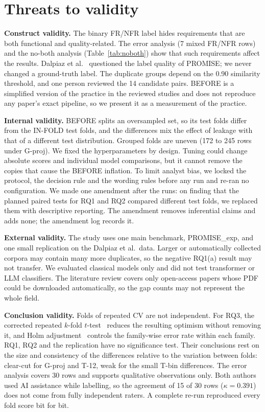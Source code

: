 \section{Threats to validity}
\label{sec:threats}

\textbf{Construct validity.} The binary FR/NFR label hides requirements that are both functional and quality-related. The error analysis (7 mixed FR/NFR rows) and the no-both analysis (Table~\ref{tab:noboth}) show that such requirements affect the results. Dalpiaz et al.~\cite{dalpiaz2019} questioned the label quality of PROMISE; we never changed a ground-truth label. The duplicate groups depend on the 0.90 similarity threshold, and one person reviewed the 14 candidate pairs. BEFORE is a simplified version of the practice in the reviewed studies and does not reproduce any paper's exact pipeline, so we present it as a measurement of the practice.

\textbf{Internal validity.} BEFORE splits an oversampled set, so its test folds differ from the IN-FOLD test folds, and the differences mix the effect of leakage with that of a different test distribution. Grouped folds are uneven (172 to 245 rows under G-proj). We fixed the hyperparameters by design. Tuning could change absolute scores and individual model comparisons, but it cannot remove the copies that cause the BEFORE inflation. To limit analyst bias, we locked the protocol, the decision rule and the wording rules before any run and re-ran no configuration. We made one amendment after the runs: on finding that the planned paired tests for RQ1 and RQ2 compared different test folds, we replaced them with descriptive reporting. The amendment removes inferential claims and adds none; the amendment log records it.

\textbf{External validity.} The study uses one main benchmark, PROMISE\_exp, and one small replication on the Dalpiaz et al.\ data. Larger or automatically collected corpora may contain many more duplicates, so the negative RQ1(a) result may not transfer. We evaluated classical models only and did not test transformer or LLM classifiers. The literature review covers only open-access papers whose PDF could be downloaded automatically, so the gap counts may not represent the whole field.

\textbf{Conclusion validity.} Folds of repeated CV are not independent. For RQ3, the corrected repeated $k$-fold $t$-test~\cite{nadeau2003,bouckaert2004} reduces the resulting optimism without removing it, and Holm adjustment~\cite{holm1979} controls the family-wise error rate within each family. RQ1, RQ2 and the replication have no significance test. Their conclusions rest on the size and consistency of the differences relative to the variation between folds: clear-cut for G-proj and T-12, weak for the small T-bin differences. The error analysis covers 30 rows and supports qualitative observations only. Both authors used AI assistance while labelling, so the agreement of 15 of 30 rows ($\kappa = 0.391$) does not come from fully independent raters. A complete re-run reproduced every fold score bit for bit.
